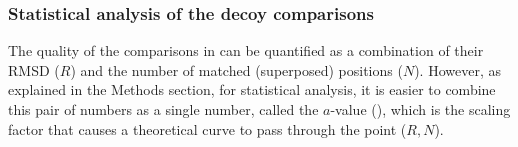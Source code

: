 %
%
%
%
%
%
%
%
%


\subsubsection{Statistical analysis of the decoy comparisons}

The quality of the comparisons in  can be quantified as a combination of their
RMSD ($R$) and the number of matched (superposed) positions ($N$).   However, as explained in 
the Methods section, for statistical analysis, it is easier to combine this pair of numbers
as a single number,  called the $a$-value (), which is the scaling factor that
causes a theoretical curve to pass through the point ($R,N$).

